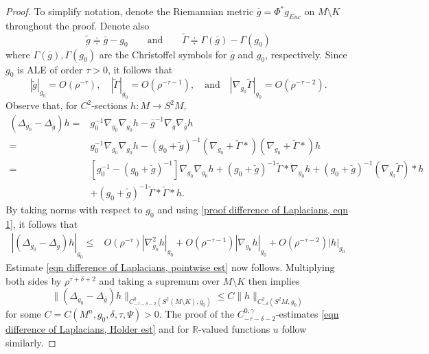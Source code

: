 \documentclass[12pt]{amsart}
\renewcommand{\1}{{\mathbf 1}}
\newcommand{\R}{{\mathbb R}}
\theoremstyle{others}
\numberwithin{equation}{section}
\begin{document}
\begin{proof} 
    To simplify notation, denote the Riemannian metric $\overline g = \Phi^* g_{Euc}$ on $M \setminus K $ throughout the proof.
    Denote also
        $$\tilde g \doteqdot \overline g - g_0 \qquad \text{and} \qquad \tilde \Gamma \doteqdot \Gamma(\overline g) - \Gamma(g_0)$$
    where $\Gamma(\overline g), \Gamma(g_0)$ are the Christoffel symbols for $\overline g$ and $g_0$, respectively.
    Since $g_0$ is ALE of order $\tau > 0$, it follows that
    \begin{equation} \label{proof difference of Laplacians, eqn 1}
        |\tilde g|_{g_0} = O ( \rho^{-\tau} ) , \quad 
        |\tilde \Gamma|_{g_0} = O ( \rho^{- \tau-1}), \quad \text{and} \quad 
        |\nabla_{g_0} \tilde \Gamma |_{g_0} = O ( \rho^{-\tau - 2} ). 
    \end{equation}
    Observe that, for $C^2$-sections $h: M \to S^2 M$,
    \begin{align*}
        (\Delta_{g_0} - \Delta_{\overline g} )h 
        ={}& g_{0}^{-1} \nabla_{g_0} \nabla_{g_0} h - \overline g^{-1} \nabla_{\overline g} \nabla_{\overline g} h \\
        ={}&  g_0^{-1} \nabla_{g_0} \nabla_{g_0}h
        - ( g_0 + \tilde g)^{-1} \left( \nabla_{g_0} + \tilde \Gamma * \right) \left( \nabla_{g_0} + \tilde \Gamma * \right) h \\
        ={}& \left[ g_0^{-1} - (g_0 + \tilde g)^{-1} \right] \nabla_{g_0} \nabla_{g_0} h 
        + ( g_0 + \tilde g)^{-1} \tilde \Gamma * \nabla_{g_0} h 
        + ( g_0 + \tilde g)^{-1} (\nabla_{g_0} \tilde \Gamma) *  h\\
        &+ ( g_0 + \tilde g)^{-1} \tilde \Gamma * \tilde \Gamma*  h.
    \end{align*}
    By taking norms with respect to $g_0$ and using \eqref{proof difference of Laplacians, eqn 1}, it follows that 
    \begin{align*}
        | (\Delta_{g_0} - \Delta_{\overline g} )h |_{g_0} 
        \le{}& O( \rho^{-\tau} ) |\nabla^2_{g_0} h |_{g_0}
        + O (\rho^{-\tau-1} ) |\nabla_{g_0} h |_{g_0} 
        + O ( \rho^{- \tau-2}) | h |_{g_0} 
    \end{align*}
    Estimate \eqref{eqn difference of Laplacians, pointwise est} now follows.
    Multiplying both sides by $\rho^{\tau + \delta + 2}$ and taking a supremum over $M\setminus K$ then implies
        $$\| ( \Delta_{g_0} - \Delta_{\overline g} ) h \|_{C^{0}_{-\tau-\delta-2} ( S^2(M\setminus K) , g_0) } \le C \| h \|_{C^2_{-\delta}(S^2M, g_0)} $$
    for some $C= C(M^n, g_0, \delta, \tau, \Psi) > 0$.
    The proof of the $C^{0, \gamma}_{-\tau-\delta-2}$-estimates \eqref{eqn difference of Laplacians, Holder est} and for $\R$-valued functions $u$ follow similarly.
\end{proof} 
\end{document}
